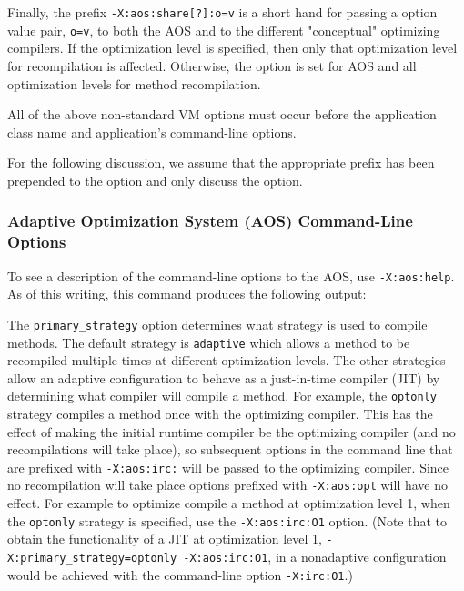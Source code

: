 Finally, the prefix {\tt -X:aos:share[?]:o=v} is a short hand for
passing a option value pair, {\tt o=v}, to both the AOS and to the
different "conceptual" optimizing compilers.  If the optimization
level is specified, then only that optimization level for
recompilation is affected.  Otherwise, the option is set for AOS and
all optimization levels for method recompilation.

All of the above non-standard VM options must occur before 
the application class name and application's command-line options.

For the following discussion, we assume that the appropriate prefix has been
prepended to the option and only discuss the option.

\subsubsection{Adaptive Optimization System (AOS) Command-Line Options}

To see a description of the command-line options to the AOS, use 
{\tt -X:aos:help}.  As of this writing, this command produces the
following output:

\T \begin{tiny}

\T \end{tiny}

The {\tt primary\_strategy} option determines what strategy is used to
compile methods.  The default strategy is {\tt adaptive} which allows
a method to be recompiled multiple times at different optimization
levels.  The other strategies allow an adaptive configuration to
behave as a just-in-time compiler (JIT) by determining what compiler
will compile a method.  For example, the {\tt optonly} strategy
compiles a method once with the optimizing compiler. This has the
effect of making the initial runtime compiler be the optimizing
compiler (and no recompilations will take place), so subsequent
options in the command line that are prefixed with {\tt -X:aos:irc:}
will be passed to the optimizing compiler. Since no recompilation will
take place options prefixed with {\tt -X:aos:opt} will have no effect.
For example to optimize compile a method at optimization level 1, when
the {\tt optonly} strategy is specified, use the {\tt -X:aos:irc:O1}
option.  (Note that to obtain the functionality of a JIT at
optimization level 1, {\tt -X:primary\_strategy=optonly
-X:aos:irc:O1}, in a nonadaptive configuration would be achieved with
the command-line option {\tt -X:irc:O1}.) 

